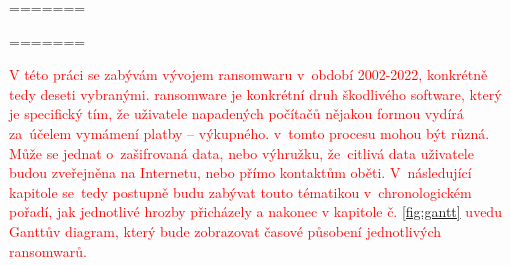 \documentclass[a4paper,12pt]{article}
\begin{document}
\voffset=\evensidemargin=\oddsidemargin=\headsep=\headheight=\setlength{\parskip}{3pt}\textheight=\textwidth=

\titulnistrana
\clearpage

\voffset=\evensidemargin=\oddsidemargin=\headsep=\headheight=\setlength{\parskip}{3pt}\textheight=\textwidth=


\abstraktaklicovaslova


\clearpage
\thispagestyle{empty}


\obsah  %


\OdsazovaniOdstavcuStart %


\cite{wiki-timeline}
\textcolor{red}{V této práci se zabývám vývojem ransomwaru v~období 2002-2022, konkrétně tedy deseti vybranými. ransomware je konkrétní druh škodlivého software, který je specifický tím, že uživatele napadených počítačů nějakou formou vydírá za~účelem vymámení platby -- výkupného.  v~tomto procesu mohou být různá. Může se jednat o~zašifrovaná data, nebo výhružku, že~citlivá data uživatele budou zveřejněna na Internetu, nebo přímo kontaktům oběti. V~následující kapitole se~tedy postupně budu zabývat touto tématikou v~chronologickém pořadí, jak jednotlivé hrozby přicházely a nakonec v kapitole č. \ref{fig:gantt} uvedu Ganttův diagram, který bude zobrazovat časové působení jednotlivých ransomwarů.}



\end{document}
